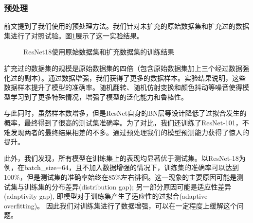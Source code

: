 \documentclass[hyperref, UTF8, 12pt]{article}
\theoremstyle{definition}
\begin{document}
\subsubsection{预处理}
前文提到了我们使用的预处理方法。我们针对未扩充的原始数据集和扩充过的数据集进行了对照试验。图\ref{fig:resnet18_amp}展示了这一实验结果。
\begin{figure}[H]
	\centering
	\caption{ResNet18使用原始数据集和扩充数据集的训练结果}
	\label{fig:resnet18_amp}
\end{figure}
扩充过的数据集的规模是原始数据集的四倍（包含原始数据集加上三个经过数据强化过的副本）。通过数据增强，我们获得了更多的数据样本。实验结果说明，这些数据样本提升了模型的准确率。随机翻转、随机仿射变换和颜色抖动等噪音使得模型学习到了更多特殊情况，增强了模型的泛化能力和鲁棒性。

\noindent 与此同时，虽然样本数增多，但是ResNet自身的BN层等设计降低了过拟合发生的概率，最终得到了很高的测试集准确率。为了对比，我们还训练了ResNet-101，不难发现两者的最终结果相差的不多。通过预处理我们的模型预测能力获得了惊人的提升。

\noindent 此外，我们发现，所有模型在训练集上的表现均显著优于测试集。以ResNet-18为例，在batch\_size=64，且不加入数据增强的情况下，训练集的准确率可以达到100$\%$，但是测试集的准确率始终在85$\%$左右徘徊。这一现象的主要原因可能是测试集与训练集的分布差异(distribution gap); 另一部分原因可能是适应性差异(adaptivity gap), 即模型对于训练集产生了适应性的过拟合(adaptive overfitting)。\cite{cifar2018} 因此我们对训练集进行了数据增强，可以在一定程度上缓解这个问题。
\end{document}
